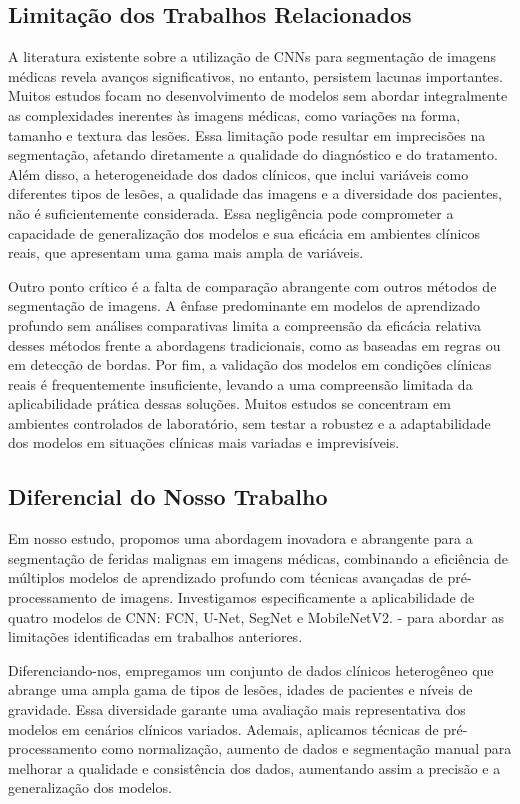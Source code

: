 \subsection{Limitação dos Trabalhos Relacionados}
A literatura existente sobre a utilização de CNNs para segmentação de imagens médicas revela avanços significativos, no entanto, persistem lacunas importantes. Muitos estudos focam no desenvolvimento de modelos sem abordar integralmente as complexidades inerentes às imagens médicas, como variações na forma, tamanho e textura das lesões. Essa limitação pode resultar em imprecisões na segmentação, afetando diretamente a qualidade do diagnóstico e do tratamento. Além disso, a heterogeneidade dos dados clínicos, que inclui variáveis como diferentes tipos de lesões, a qualidade das imagens e a diversidade dos pacientes, não é suficientemente considerada. Essa negligência pode comprometer a capacidade de generalização dos modelos e sua eficácia em ambientes clínicos reais, que apresentam uma gama mais ampla de variáveis.

Outro ponto crítico é a falta de comparação abrangente com outros métodos de segmentação de imagens. A ênfase predominante em modelos de aprendizado profundo sem análises comparativas limita a compreensão da eficácia relativa desses métodos frente a abordagens tradicionais, como as baseadas em regras ou em detecção de bordas. Por fim, a validação dos modelos em condições clínicas reais é frequentemente insuficiente, levando a uma compreensão limitada da aplicabilidade prática dessas soluções. Muitos estudos se concentram em ambientes controlados de laboratório, sem testar a robustez e a adaptabilidade dos modelos em situações clínicas mais variadas e imprevisíveis.


\subsection{Diferencial do Nosso Trabalho }
Em nosso estudo, propomos uma abordagem inovadora e abrangente para a segmentação de feridas malignas em imagens médicas, combinando a eficiência de múltiplos modelos de aprendizado profundo com técnicas avançadas de pré-processamento de imagens. Investigamos especificamente a aplicabilidade de quatro modelos de \ac{CNN}: \ac{FCN}, \ac{U-Net}, \ac{SegNet} e \ac{MobileNetV2}. - para abordar as limitações identificadas em trabalhos anteriores.

Diferenciando-nos, empregamos um conjunto de dados clínicos heterogêneo que abrange uma ampla gama de tipos de lesões, idades de pacientes e níveis de gravidade. Essa diversidade garante uma avaliação mais representativa dos modelos em cenários clínicos variados. Ademais, aplicamos técnicas de pré-processamento como normalização, aumento de dados e segmentação manual para melhorar a qualidade e consistência dos dados, aumentando assim a precisão e a generalização dos modelos. 

